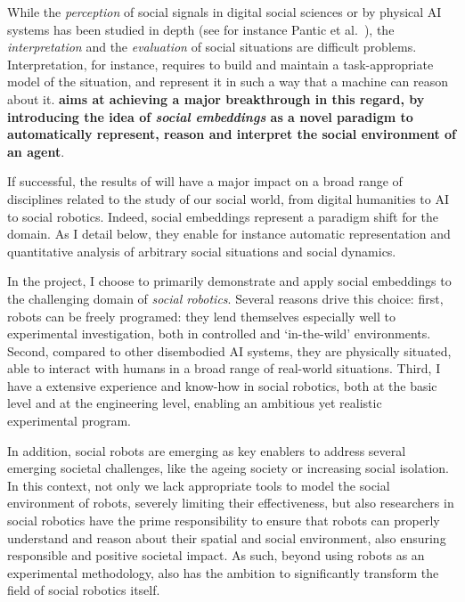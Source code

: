 While the \emph{perception} of social signals in digital social sciences or by
physical AI systems has been studied in depth (see for instance Pantic et
al.~\cite{pantic2011social}), the \emph{interpretation} and the
\emph{evaluation} of social situations are difficult problems.  Interpretation,
for instance, requires to build and maintain a task-appropriate model of the
situation, and represent it in such a way that a machine can reason about it.
\textbf{\project aims at achieving a major breakthrough in this regard,
by introducing the idea of \emph{social embeddings} as a novel paradigm to
automatically represent, reason and interpret the social environment of an
agent}.


If successful, the results of \project will have a major impact on a broad range
of disciplines related to the study of our social world, from digital humanities
to AI to social robotics. Indeed, social embeddings represent a paradigm
shift for the domain. As I detail below, they enable for instance automatic representation
and quantitative analysis of arbitrary social situations and social dynamics.

In the \project project, I choose to primarily demonstrate and apply social
embeddings to the challenging domain of \emph{social robotics}. Several reasons
drive this choice: first, robots can be freely programed: they lend themselves
especially well to experimental investigation, both in controlled and
`in-the-wild' environments.  Second, compared to other disembodied AI systems,
they are physically situated, able to interact with humans in a broad range of
real-world situations. Third, I have a extensive experience and know-how in
social robotics, both at the basic level and at the engineering level, enabling
an ambitious yet realistic experimental program.

In addition, social robots are emerging as key enablers to address several
emerging societal challenges, like the ageing society or increasing social
isolation. In this context, not only we lack appropriate tools to model the
social environment of robots, severely limiting their effectiveness, but also
researchers in social robotics have the prime responsibility to ensure that
robots can properly understand and reason about their spatial and social
environment, also ensuring responsible and positive societal impact. As such,
beyond using robots as an experimental methodology, \project also has the
ambition to significantly transform the field of social robotics itself.

